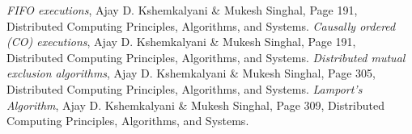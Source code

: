 \documentclass[a4paper, 12pt]{article}
\begin{document}
	\begin{thebibliography}{4}
		 \textit{FIFO executions}, Ajay D. Kshemkalyani \& Mukesh Singhal, Page 191, Distributed Computing Principles, Algorithms, and Systems.
		 \textit{Causally ordered (CO) executions}, Ajay D. Kshemkalyani \& Mukesh Singhal, Page 191, Distributed Computing Principles, Algorithms, and Systems.
		\textit{Distributed mutual exclusion algorithms}, Ajay D. Kshemkalyani \& Mukesh Singhal, Page 305, Distributed Computing Principles, Algorithms, and Systems.
		\textit{Lamport's Algorithm}, Ajay D. Kshemkalyani \& Mukesh Singhal, Page 309, Distributed Computing Principles, Algorithms, and Systems.
	\end{thebibliography}
			
\end{document}
